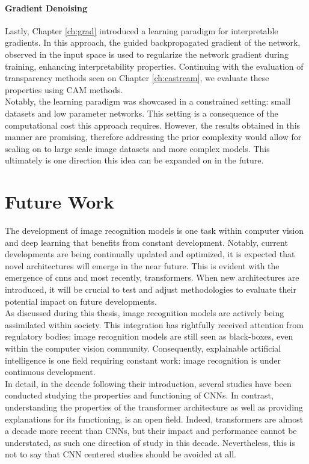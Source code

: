 \paragraph{Gradient Denoising}
\label{sub:conc_grad}
\noindent Lastly, Chapter \ref{ch:grad} introduced a learning paradigm for interpretable gradients. 
In this approach, the guided backpropagated gradient of the network, observed in the input space is 
used to regularize the network gradient during training, enhancing interpretability properties. 
Continuing with the evaluation of transparency methods seen on Chapter \ref{ch:castream}, we 
evaluate these properties using CAM methods.\\

\noindent Notably, the learning paradigm was showcased in a constrained setting: small datasets and 
low parameter networks. This setting is a consequence of the computational cost this approach 
requires. However, the results obtained in this manner are promising, therefore addressing the 
prior complexity would allow for scaling on to large scale image datasets and more complex models. 
This ultimately is one direction this idea can be expanded on in the future. 

\section{Future Work}
\label{sec:conc_futur}
The development of image recognition models is one task within computer vision and deep learning 
that benefits from constant development. Notably, current developments are being continually 
updated and optimized, it is expected  that novel architectures will emerge in the near future. 
This is evident with the emergence of \glspl{cnn} and most recently, transformers. When new 
architectures are introduced, it will be crucial to test and adjust methodologies to evaluate 
their potential impact on future developments. \\

\noindent As discussed during this thesis, image recognition models are actively being assimilated 
within society. This integration has rightfully received attention from regulatory bodies: image 
recognition models are still seen as black-boxes, even within the computer vision community. 
Consequently, explainable artificial intelligence is one field requiring constant work:
image recognition is under continuous development.\\

\noindent In detail, in the decade following their introduction, several studies have been 
conducted studying the properties and functioning of CNNs. In contrast, understanding the properties 
of the transformer architecture as well as providing explanations for its functioning, is an open 
field. Indeed, transformers are almost a decade more recent than CNNs, but their impact and 
performance cannot be understated, as such one direction of study in this decade. Nevertheless, 
this is not to say that CNN centered studies should be avoided at all.\\


